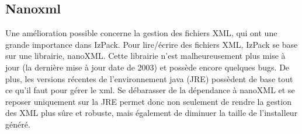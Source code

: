 \subsection{Nanoxml}
Une amélioration possible concerne la gestion des fichiers XML, qui ont une grande importance dans IzPack.
Pour lire/écrire des fichiers XML, IzPack se base sur une librairie, nanoXML. Cette librairie n'est malheureusement plus mise à jour (la dernière mise à jour date de 2003) et possède encore quelques bugs.
De plus, les versions récentes de l'environnement java (JRE) possèdent de base tout ce qu'il faut pour gérer le xml.
Se débarasser de la dépendance à nanoXML et se reposer uniquement sur la JRE permet donc non seulement de rendre la gestion des XML plus sûre et robuste, mais également de diminuer la taille de l'installeur généré.